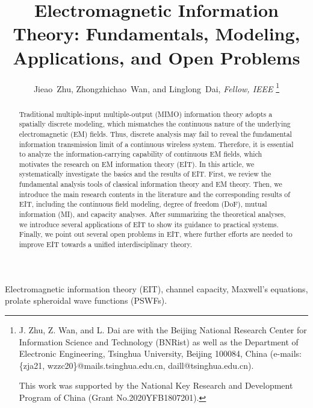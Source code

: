 \documentclass[journal,twocolumn]{IEEEtran}
\begin{document}
\title{Electromagnetic Information Theory: Fundamentals, Modeling, Applications, and Open Problems}

\author{{Jieao~Zhu, Zhongzhichao~Wan, and Linglong~Dai, {\textit{Fellow, IEEE}}}
\thanks{J. Zhu, Z. Wan, and L. Dai are with the Beijing National Research Center for Information Science and Technology (BNRist) as well as the Department of Electronic Engineering, Tsinghua University, Beijing 100084, China (e-mails: \{zja21, wzzc20\}@mails.tsinghua.edu.cn, daill@tsinghua.edu.cn).

This work was supported by the National Key Research and Development Program of China (Grant No.2020YFB1807201). }
}

\maketitle

\begin{abstract}
	Traditional multiple-input multiple-output (MIMO) information theory adopts a spatially discrete modeling, which mismatches the continuous nature of the underlying electromagnetic (EM) fields.
	Thus, discrete analysis may fail to reveal the fundamental information transmission limit of a continuous wireless system.    
 	Therefore, it is essential to analyze the information-carrying capability of continuous EM fields, which motivates the research on EM information theory (EIT). In this article, we systematically investigate the basics and the results of EIT. First, we review the fundamental analysis tools of classical information theory and EM theory. Then, we introduce the main research contents in the literature and the corresponding results of EIT, including the continuous field modeling, degree of freedom (DoF), mutual information (MI), and capacity analyses. After summarizing the theoretical analyses, we introduce several applications of EIT to show its guidance to practical systems. Finally, we point out several open problems in EIT, where further efforts are needed to improve EIT towards a unified interdisciplinary theory.
\end{abstract}

\begin{IEEEkeywords}
    Electromagnetic information theory (EIT), channel capacity, Maxwell's equations, prolate spheroidal wave functions (PSWFs). 
\end{IEEEkeywords}
\end{document}
